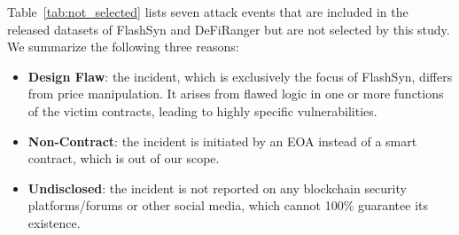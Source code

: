 Table~\ref{tab:not_selected} lists seven attack events that are included in the released datasets of FlashSyn and DeFiRanger but are not selected by this study. We summarize the following three reasons:
\begin{itemize}
 \item\textbf{Design Flaw}:
the incident, which is exclusively the focus of FlashSyn, differs from price manipulation. It arises from flawed logic in one or more functions of the victim contracts, leading to highly specific vulnerabilities.
 \item\textbf{Non-Contract}: the incident is initiated by an EOA instead of a smart contract, which is out of our scope.
 \item\textbf{Undisclosed}: the incident is not reported on any blockchain security platforms/forums or other social media, which cannot 100\% guarantee its existence.
\end{itemize}

